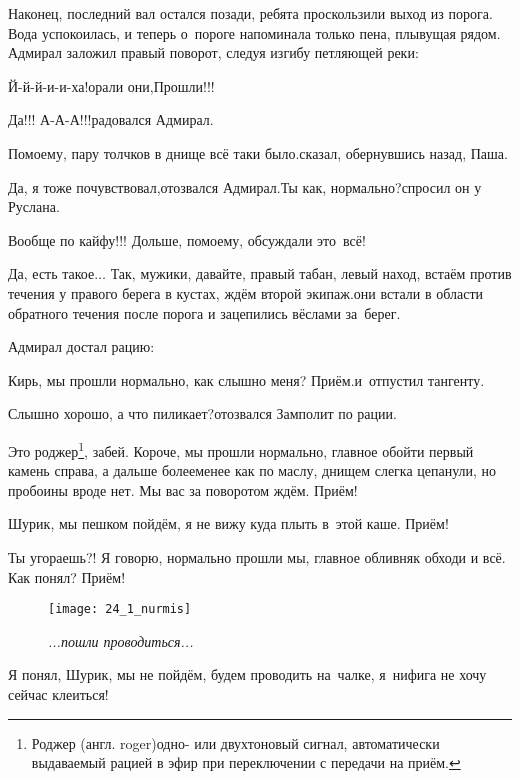 Наконец, последний вал остался позади, ребята проскользили выход из порога. Вода успокоилась, и теперь о~пороге напоминала только пена, плывущая рядом. Адмирал заложил правый поворот, следуя изгибу петляющей реки:

\diagdash Й-й-й-и-и-ха!\mdash орали они,\mdash Прошли!!!

\diagdash Да!!! А-А-А!!!\mdash радовался Адмирал.

\diagdash По\sdash моему, пару толчков в днище всё таки было.\mdash сказал, обернувшись назад, Паша. 

\diagdash Да, я тоже почувствовал,\mdash отозвался Адмирал.\mdash Ты как, нормально?\mdash спросил он у Руслана.

\diagdash Вообще по кайфу!!! Дольше, по\sdash моему, обсуждали это~всё!

\diagdash Да, есть такое$\ldots$ Так, мужики, давайте, правый табан, левый наход, встаём против течения у правого берега в кустах, ждём второй экипаж.\mdash они встали в области обратного течения после порога и зацепились вёслами за~берег.

Адмирал достал рацию:

\diagdash Кирь, мы прошли нормально, как слышно меня? Приём.\mdash и~отпустил тангенту.

\diagdash Слышно хорошо, а что пиликает?\mdash отозвался Замполит по рации.

\renewcommand*{\thefootnote}{\fnsymbol{footnote}}
\setcounter{footnote}{0}
\diagdash Это роджер\footnote{Роджер (англ. roger)\mdash одно- или двухтоновый сигнал, автоматически выдаваемый рацией в эфир при переключении с передачи на приём.}, забей. Короче, мы прошли нормально, главное обойти первый камень справа, а дальше более\sdash менее как по маслу, днищем слегка цепанули, но пробоины вроде нет. Мы вас за поворотом ждём. Приём!

\diagdash Шурик, мы пешком пойдём, я не вижу куда плыть в~этой каше. Приём!

\diagdash Ты угораешь?! Я говорю, нормально прошли мы, главное обливняк обходи и всё. Как понял? Приём!

{
\setlength{\belowcaptionskip}{-20pt}
\begin{figure}[h]
	\centering
	\texttt{[image: 24\_1\_nurmis]}
	\caption{\small\textit{...пошли проводиться...}}
\end{figure}
%
\diagdash Я понял, Шурик, мы не пойдём, будем проводить на~чалке, я~нифига не хочу сейчас клеиться! %
}

